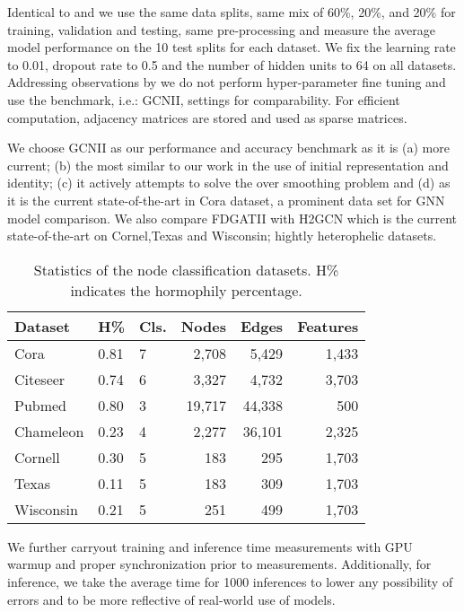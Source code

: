 \documentclass{article}
\begin{document}
Identical to \citet{pei2019geom} and \citet{chen2020simple} we use the same data splits, same mix of 60\%, 20\%, and 20\% for training, validation and testing, same pre-processing and measure the average model performance on the 10 test splits for each dataset. We fix the learning rate to 0.01, dropout rate to 0.5 and the number of hidden units to 64 on all datasets. Addressing observations by \citet{alon2020bottleneck} we do not perform  hyper-parameter fine tuning and use the benchmark, i.e.: GCNII, settings for comparability. For efficient computation, adjacency matrices are stored and used as sparse matrices.

We choose GCNII \cite{chen2020simple} as our performance and accuracy benchmark as it is (a) more current; (b) the most similar to our work in the use of initial representation and identity; (c) it actively attempts to solve the over smoothing problem and (d) as it is the current state-of-the-art in Cora dataset, a prominent data set for GNN model comparison. We also compare FDGATII with H2GCN \cite{zhu2020beyond} which is the current state-of-the-art on Cornel,Texas and Wisconsin; hightly heterophelic datasets.

\begin{table}[h]
    \caption{Statistics of the node classification datasets. H\% indicates the hormophily percentage.}
    \begin{tabular}{lllrrr}
    \toprule
    Dataset   & H\% & Cls. & Nodes  & Edges   & Features \\ \midrule
    Cora      & 0.81       & 7       & 2,708  & 5,429   & 1,433    \\
    Citeseer  & 0.74       & 6       & 3,327  & 4,732   & 3,703    \\
    Pubmed    & 0.80       & 3       & 19,717 & 44,338  & 500      \\
    Chameleon & 0.23       & 4       & 2,277  & 36,101  & 2,325    \\
    Cornell   & 0.30       & 5       & 183    & 295     & 1,703    \\
    Texas     & 0.11       & 5       & 183    & 309     & 1,703    \\
    Wisconsin & 0.21       & 5       & 251    & 499     & 1,703    \\ \bottomrule
\end{tabular}
    \label{table_dataset}
\end{table}

We further carryout training and inference time measurements with GPU warmup and proper synchronization prior to measurements. Additionally, for inference, we take the average time for 1000 inferences to lower any possibility of errors  and to be more reflective of real-world use of models.
\end{document}
